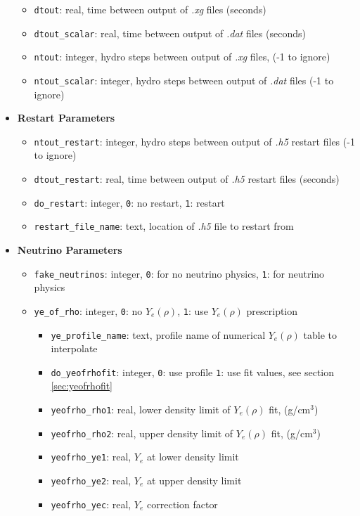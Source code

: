 \documentclass[10pt,nofootinbib]{article}
\newcommand{\code}[1]{\texttt{#1}}
\begin{document}
\begin{itemize}
\begin{itemize}
\item{{\tt dtout}: real, time between output of {\it .xg} files (seconds)}
\item{{\tt dtout\_scalar}: real, time between output of {\it .dat} files (seconds)}
\item{{\tt ntout}: integer, hydro steps between output of {\it .xg} files, (-1 to ignore)}
\item{{\tt ntout\_scalar}: integer, hydro steps between output of {\it .dat} files (-1 to ignore)}
\end{itemize}
\item{{\bf Restart Parameters}}
\begin{itemize}
\item{{\tt ntout\_restart}: integer, hydro steps between output of {\it .h5} restart files (-1 to ignore)}
\item{{\tt dtout\_restart}: real, time between output of {\it .h5} restart files (seconds)}
\item{{\tt do\_restart}: integer, \code{0}: no restart, \code{1}: restart}
\item{{\tt restart\_file\_name}: text, location of {\it .h5} file to restart from}
\end{itemize}
\item{{\bf Neutrino Parameters}}
\begin{itemize}
\item{{\tt fake\_neutrinos}: integer, \code{0}: for no neutrino physics, \code{1}: for neutrino physics}
\item{{\tt ye\_of\_rho}: integer, \code{0}: no $Y_e(\rho)$, \code{1}: use $Y_e(\rho)$ prescription}
\begin{itemize}
\item{{\tt ye\_profile\_name}: text, profile name of numerical $Y_e(\rho)$ table to interpolate}
\item{{\tt do\_yeofrhofit}: integer, \code{0}: use profile \code{1}: use fit values, see section \ref{sec:yeofrhofit}}
\item{{\tt yeofrho\_rho1}: real, lower density limit of $Y_e(\rho)$ fit, (g/cm$^3$)}
\item{{\tt yeofrho\_rho2}: real, upper density limit of $Y_e(\rho)$ fit, (g/cm$^3$)}
\item{{\tt yeofrho\_ye1}: real, $Y_e$ at lower density limit}
\item{{\tt yeofrho\_ye2}: real, $Y_e$ at upper density limit}
\item{{\tt yeofrho\_yec}: real, $Y_e$ correction factor}
\end{itemize}

\end{itemize}
\end{itemize}
\end{document}
